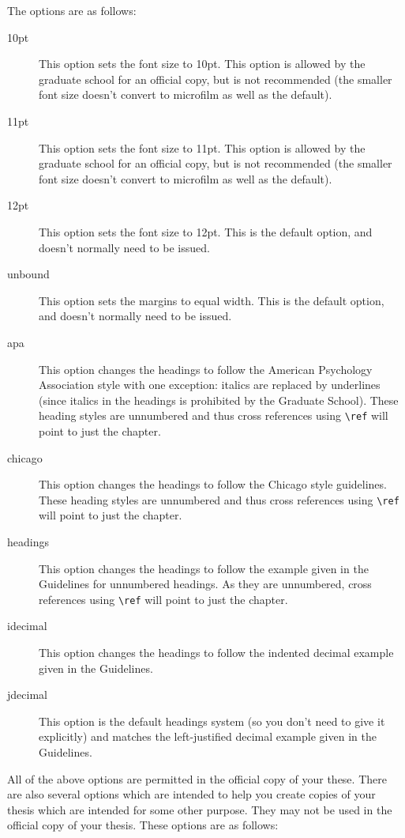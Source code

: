 \pagebreak[3]The options are as follows:
\begin{description}
\item[10pt]{This option sets the font size to 10pt.  This option is allowed by the graduate school for an official copy, but is not recommended (the smaller font size doesn't convert to microfilm as well as the default).}
\item[11pt]{This option sets the font size to 11pt.  This option is allowed by the graduate school for an official copy, but is not recommended (the smaller font size doesn't convert to microfilm as well as the default).}
\item[12pt]{This option sets the font size to 12pt.  This is the default option, and doesn't normally need to be issued.}
\item[unbound]{This option sets the margins to equal width.  This is the default option, and doesn't normally need to be issued.}
\item[apa]{This option changes the headings to follow the American Psychology Association style with one exception: italics are replaced by underlines (since italics in the headings is prohibited by the Graduate School).  These heading styles are unnumbered and thus cross references using \verb=\ref= will point to just the chapter.}
\item[chicago]{This option changes the headings to follow the Chicago style guidelines.  These heading styles are unnumbered and thus cross references using \verb=\ref= will point to just the chapter.}
\item[headings]{This option changes the headings to follow the example given in the Guidelines for unnumbered headings.  As they are unnumbered, cross references using \verb=\ref= will point to just the chapter.}
\item[idecimal]{This option changes the headings to follow the indented decimal example given in the Guidelines.}
\item[jdecimal]{This option is the default headings system (so you don't need to give it explicitly) and matches the left-justified decimal example given in the Guidelines.}
\end{description}

All of the above options are permitted in the official copy of your these.  There are also several options which are intended to help you create copies of your thesis which are intended for some other purpose.  They may not be used in the official copy of your thesis.  These options are as follows:


